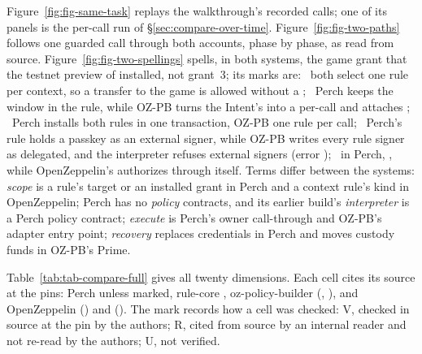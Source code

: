 
Figure~\ref{fig:fig-same-task} replays the walkthrough's recorded calls; one of
its panels is the per-call run of \S\ref{sec:compare-over-time}.
Figure~\ref{fig:fig-two-paths} follows one guarded call through both accounts,
phase by phase, as read from source. Figure~\ref{fig:fig-two-spellings} spells, in
both systems, the game grant that the testnet preview of 
installed, not grant~3; its marks are: ~both select one rule per
context, so a transfer to the game is allowed without a ;
~Perch keeps the window in the rule, while OZ-PB turns the Intent's
 into a per-call  and attaches ;
~Perch installs both rules in one transaction, OZ-PB one rule per
 call; ~Perch's rule holds a passkey as an
external signer, while OZ-PB writes every rule signer as delegated, and the
interpreter refuses external signers (error );
~in Perch, , while OpenZeppelin's
 authorizes through itself. Terms differ between the systems:
\emph{scope} is a rule's target or an installed grant in Perch and a context
rule's kind in OpenZeppelin; Perch has no \emph{policy} contracts, and its earlier
build's \emph{interpreter} is a Perch  policy
contract; \emph{execute} is Perch's owner call-through and OZ-PB's adapter entry
point; \emph{recovery} replaces credentials in Perch and moves custody funds in
OZ-PB's Prime.

Table~\ref{tab:tab-compare-full} gives all twenty dimensions. Each cell cites its
source at the pins: Perch  unless marked, rule-core
, oz-policy-builder 
(, ), and OpenZeppelin
  () and
 (). The mark records how a cell was
checked: V, checked in source at the pin by the authors; R, cited from source by
an internal reader and not re-read by the authors; U, not verified.



